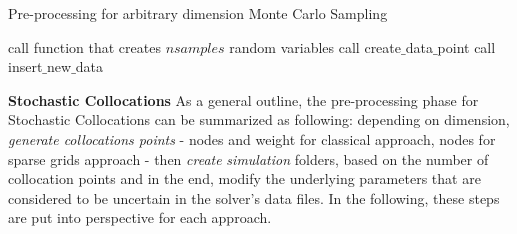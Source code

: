 \begin{algorithm}
\caption{Pre-processing for arbitrary dimension Monte Carlo Sampling
\label{alg:1DMCS_preproc}}
  \begin{algorithmic}[1]
    		\State call function that creates $nsamples$ random variables
    	\EndFor
        \State call create$\_$data$\_$point 
        \State call insert$\_$new$\_$data 
    \EndFor
  \end{algorithmic}
\end{algorithm}
\newline	
\textbf{Stochastic Collocations}
\newline
	As a general outline, the pre-processing phase for Stochastic Collocations can be summarized as following: depending on dimension, \emph{generate collocations points} - nodes and weight for classical approach, nodes for sparse grids approach - then \emph{create} \emph{simulation} folders, based on the number of collocation points and in the end, modify the underlying parameters that are considered to be uncertain in the solver's data files. In the following, these steps are put into perspective for each approach.
